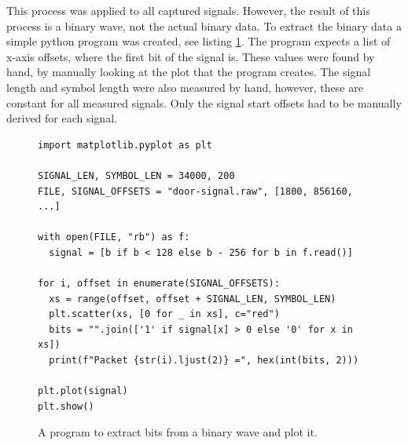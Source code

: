 This process was applied to all captured signals. However, the result of this process is a binary wave, not the actual binary data. To extract the binary data a simple python program was created, see listing \ref{lst:extract-bits}. The program expects a list of x-axis offsets, where the first bit of the signal is. These values were found by hand, by manually looking at the plot that the program creates. The signal length and symbol length were also measured by hand, however, these are constant for all measured signals. Only the signal start offsets had to be manually derived for each signal.
\begin{figure}[ht]
    \begin{verbatim}
import matplotlib.pyplot as plt

SIGNAL_LEN, SYMBOL_LEN = 34000, 200
FILE, SIGNAL_OFFSETS = "door-signal.raw", [1800, 856160, ...]

with open(FILE, "rb") as f:
  signal = [b if b < 128 else b - 256 for b in f.read()]

for i, offset in enumerate(SIGNAL_OFFSETS):
  xs = range(offset, offset + SIGNAL_LEN, SYMBOL_LEN)
  plt.scatter(xs, [0 for _ in xs], c="red")
  bits = "".join(['1' if signal[x] > 0 else '0' for x in xs])
  print(f"Packet {str(i).ljust(2)} =", hex(int(bits, 2)))

plt.plot(signal)
plt.show()
    \end{verbatim}
    \caption{A program to extract bits from a binary wave and plot it.}
    \label{lst:extract-bits}
\end{figure}


